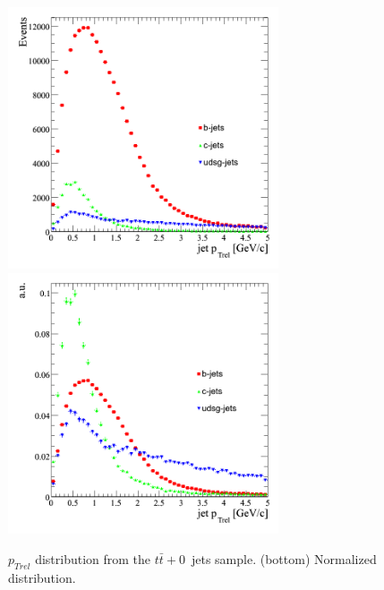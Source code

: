 \begin{figure}[htbp]
  \begin{center}
    \includegraphics[width=80mm]{Figures/jet_ptrel_tt0j.png}
    \includegraphics[width=80mm]{Figures/jet_ptrel_norm_tt0j.png}
  \end{center}
  \caption{$p_{Trel}$ distribution from the $t\bar{t}+0$~jets sample. (bottom) Normalized distribution.}
  \label{fig:jet_ptrel_all_ttbar}
\end{figure}


\clearpage

